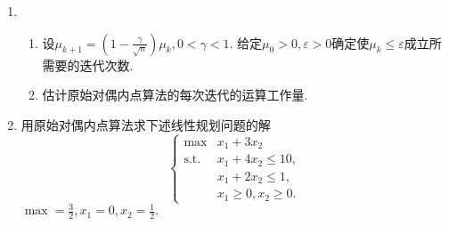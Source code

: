 \begin{enumerate}
    \omitted
    \item \begin{enumerate}[label=(\arabic*)]
        \item 设$\displaystyle \mu_{k+1}=\left(1-\frac{\gamma}{\sqrt{n}}\right)\mu_k,0<\gamma<1$. 给定$\mu_0 > 0,\varepsilon > 0$确定使$\mu_k \leqslant \varepsilon$成立所需要的迭代次数.
        \item 估计原始对偶内点算法的每次迭代的运算工作量.
    \end{enumerate}
    \omitted
    \item 用原始对偶内点算法求下述线性规划问题的解
    \[\begin{cases}
        \max & x_1+3x_2\\
        \text{s.t.} & x_1+4x_2 \leqslant 10,\\
        & x_1+2x_2 \leqslant 1,\\
        & x_1 \geqslant 0, x_2 \geqslant 0.
    \end{cases}\]
    \sol $\displaystyle\max=\frac{3}{2},x_1=0,x_2=\frac{1}{2}.$
\end{enumerate}
\clearpage